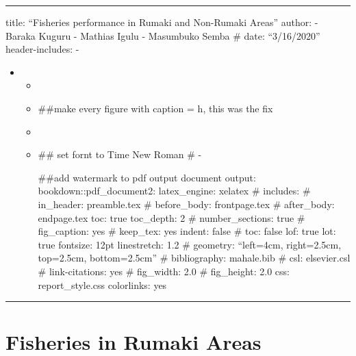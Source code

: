 \documentclass[
]{article}
\author{}
\date{\vspace{-2.5em}}
\begin{document}
{
\setcounter{tocdepth}{2}
\tableofcontents
}
\begin{center}\rule{0.5\linewidth}{0.5pt}\end{center}

title: ``Fisheries performance in Rumaki and Non-Rumaki Areas''
author:
- Baraka Kuguru
- Mathias Igulu
- Masumbuko Semba
\# date: ``3/16/2020''
header-includes:
-

\usepackage{titling}

\begin{itemize}
\item
  \posttitle{\end{center}}

  \begin{itemize}
  \item
    \usepackage{float}
  \item
     \#\#make every figure with caption = h, this was the fix
  \item
    \usepackage{fontspec}
  \item
    \setmainfont{Adobe Caslon Pro} \#\# set fornt to Time New Roman
    \# -

    \usepackage{draftwatermark}

    \#\#add watermark to pdf output document
    output:
    bookdown::pdf\_document2:
    latex\_engine: xelatex
    \# includes:
    \# in\_header: preamble.tex
    \# before\_body: frontpage.tex
    \# after\_body: endpage.tex
    toc: true
    toc\_depth: 2
    \# number\_sections: true
    \# fig\_caption: yes
    \# keep\_tex: yes
    indent: false
    \# toc: false
    lof: true
    lot: true
    fontsize: 12pt
    linestretch: 1.2
    \# geometry: ``left=4cm, right=2.5cm, top=2.5cm, bottom=2.5cm''
    \# bibliography: mahale.bib
    \# csl: elsevier.csl
    \# link-citations: yes
    \# fig\_width: 2.0
    \# fig\_height: 2.0
    css: report\_style.css
    colorlinks: yes
  \end{itemize}
\end{itemize}

\begin{center}\rule{0.5\linewidth}{0.5pt}\end{center}

\hypertarget{fisheries-in-rumaki-areas}{%
\section{Fisheries in Rumaki Areas}\label{fisheries-in-rumaki-areas}}
\end{document}

